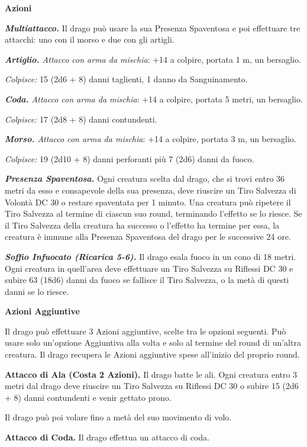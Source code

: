 \begin{multicols}{2}
{\textbf{Azioni}

\emph{\textbf{Multiattacco.}} Il drago può usare la sua Presenza Spaventosa e poi effettuare tre attacchi: uno con il morso e due con gli artigli.

\emph{\textbf{Artiglio.} Attacco con arma da mischia}: +14 a colpire, portata 1 m, un bersaglio.

\emph{Colpisce:} 15 (2d6 + 8) danni taglienti, 1 danno da Sanguinamento.

\emph{\textbf{Coda.} Attacco con arma da mischia}: +14 a colpire, portata 5 metri, un bersaglio.

\emph{Colpisce:} 17 (2d8 + 8) danni contundenti.

\emph{\textbf{Morso.} Attacco con arma da mischia}: +14 a colpire, portata 3 m, un bersaglio.

\emph{Colpisce:} 19 (2d10 + 8) danni perforanti più 7 (2d6) danni da fuoco.

\emph{\textbf{Presenza Spaventosa.}} Ogni creatura scelta dal drago, che si trovi entro 36 metri da esso e consapevole della sua presenza, deve riuscire un Tiro Salvezza di Volontà DC 30 o restare spaventata per 1 minuto. Una creatura può ripetere il Tiro Salvezza al termine di ciascun suo round, terminando l'effetto se lo riesce. Se il Tiro Salvezza della creatura ha successo o l'effetto ha termine per essa, la creatura è immune alla Presenza Spaventosa del drago per le successive 24 ore.

\emph{\textbf{Soffio Infuocato (Ricarica 5-6).}} Il drago esala fuoco in un cono di 18 metri. Ogni creatura in quell'area deve effettuare un Tiro Salvezza su Riflessi DC 30 e subire 63 (18d6) danni da fuoco se fallisce il Tiro Salvezza, o la metà di questi danni se lo riesce.

\textbf{Azioni Aggiuntive}

Il drago può effettuare 3 Azioni aggiuntive, scelte tra le opzioni seguenti. Può usare solo un'opzione Aggiuntiva alla volta e solo al termine del round di un'altra creatura. Il drago recupera le Azioni aggiuntive spese all'inizio del proprio round.

\textbf{Attacco di Ala (Costa 2 Azioni).} Il drago batte le ali. Ogni creatura entro 3 metri dal drago deve riuscire un Tiro Salvezza su Riflessi DC 30 o subire 15 (2d6 + 8) danni contundenti e venir gettato prono.

Il drago può poi volare fino a metà del suo movimento di volo.

\textbf{Attacco di Coda.} Il drago effettua un attacco di coda.

}
\end{multicols}
